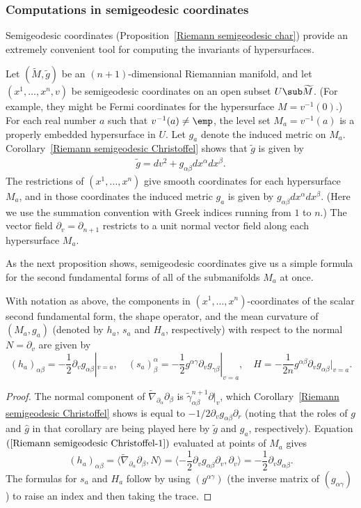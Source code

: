 \subsubsection{Computations in semigeodesic coordinates}
Semigeodesic coordinates (Proposition~\ref{Riemann semigeodesic char}) provide an extremely convenient tool for computing the invariants of hypersurfaces.\par
Let $(\widetilde{M},\tilde{g})$ be an $(n+1)$-dimensional Riemannian manifold, and let $(x^1,\dots,x^n,v)$ be semigeodesic coordinates on an open subset $U\sub\widetilde{M}$. 
(For example, they might be Fermi coordinates for the hypersurface $M=v^{-1}(0)$.) For each real number $a$ such that $v^{-1}(a)\neq\emp$, the level set $M_a=v^{-1}(a)$ 
is a properly embedded hypersurface in $U$. Let $g_a$ denote the induced metric on $M_a$. Corollary~\ref{Riemann semigeodesic Christoffel} shows that $\tilde{g}$ is 
given by
\begin{align}\label{Riemann hypersurface semigeodesic metric}
\tilde{g}=dv^2+g_{\alpha\beta}dx^\alpha dx^\beta.
\end{align}
The restrictions of $(x^1,\dots,x^n)$ give smooth coordinates for each hypersurface $M_a$, and in those coordinates the induced metric $g_a$ is given by $g_{\alpha\beta}dx^\alpha dx^\beta$. 
(Here we use the summation convention with Greek indices running from $1$ to $n$.) The vector field $\partial_v=\partial_{n+1}$ restricts to a unit normal vector field 
along each hypersurface $M_a$.\par
As the next proposition shows, semigeodesic coordinates give us a simple formula for the second fundamental forms of all of the submanifolds $M_a$ at once.
\begin{proposition}\label{Riemann hypersurface semigeodesic curvature}
With notation as above, the components in $(x^1,\dots,x^n)$-coordinates of the scalar second fundamental form, the shape operator, and the mean curvature of $(M_a,g_a)$ 
(denoted by $h_a$, $s_a$ and $H_a$, respectively) with respect to the normal $N=\partial_v$ are given by
\[(h_a)_{\alpha\beta}=-\frac{1}{2}\partial_vg_{\alpha\beta}|_{v=a},\quad(s_a)^{\alpha}_{\beta}=-\frac{1}{2}g^{\alpha\gamma}\partial_vg_{\gamma\beta}|_{v=a},\quad H=-\frac{1}{2n}g^{\alpha\beta}\partial_vg_{\alpha\beta}|_{v=a}.\]
\end{proposition}
\begin{proof}
The normal component of $\widetilde{\nabla}_{\partial_\alpha}\partial_\beta$ is $\tilde{\gamma}_{\alpha\beta}^{n+1}\partial|_v$, which Corollary~\ref{Riemann semigeodesic Christoffel} 
shows is equal to $-1/2\partial_vg_{\alpha\beta}\partial_r$ (noting that the roles of $g$ and $\hat{g}$ in that corollary are being played here by $\tilde{g}$ 
and $g_a$, respectively). Equation $(\ref{Riemann semigeodesic Christoffel-1})$ evaluated at points of $M_a$ gives
\[(h_a)_{\alpha\beta}=\langle\widetilde{\nabla}_{\partial_\alpha}\partial_\beta,N\rangle=\langle-\frac{1}{2}\partial_vg_{\alpha\beta}\partial_v,\partial_v\rangle=-\frac{1}{2}\partial_vg_{\alpha\beta}.\]
The formulas for $s_a$ and $H_a$ follow by using $(g^{\alpha\gamma})$ (the inverse matrix of $(g_{\alpha\gamma})$) to raise an index and then taking the trace.
\end{proof}
